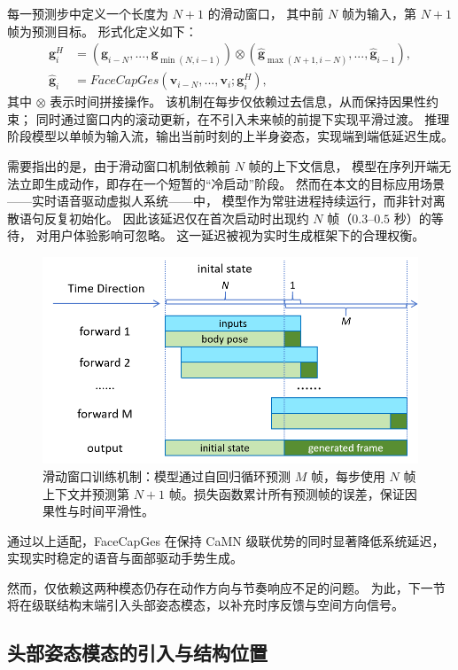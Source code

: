 每一预测步中定义一个长度为 $N+1$ 的滑动窗口，
其中前 $N$ 帧为输入，第 $N+1$ 帧为预测目标。
形式化定义如下：
\begin{align}
\bm{g}^H_i &= (\bm{g}_{i-N}, ..., \bm{g}_{\min(N, i-1)}) \otimes (\hat{\bm{g}}_{\max(N+1, i-N)}, ..., \hat{\bm{g}}_{i-1}), \\
\hat{\bm{g}}_i &= FaceCapGes(\bm{v}_{i-N}, ..., \bm{v}_i; \bm{g}^H_i),
\end{align}
其中 $\otimes$ 表示时间拼接操作。
该机制在每步仅依赖过去信息，从而保持因果性约束；
同时通过窗口内的滚动更新，在不引入未来帧的前提下实现平滑过渡。
推理阶段模型以单帧为输入流，输出当前时刻的上半身姿态，实现端到端低延迟生成。

需要指出的是，由于滑动窗口机制依赖前 $N$ 帧的上下文信息，
模型在序列开端无法立即生成动作，即存在一个短暂的“冷启动”阶段。
然而在本文的目标应用场景——实时语音驱动虚拟人系统——中，
模型作为常驻进程持续运行，而非针对离散语句反复初始化。
因此该延迟仅在首次启动时出现约 $N$ 帧（$0.3$--$0.5$ 秒）的等待，
对用户体验影响可忽略。
这一延迟被视为实时生成框架下的合理权衡。

\begin{figure}[h!t]
\centering
\includegraphics[width=0.75\linewidth]{figures/Fig2.png}
\caption{滑动窗口训练机制：模型通过自回归循环预测 $M$ 帧，每步使用 $N$ 帧上下文并预测第 $N+1$ 帧。损失函数累计所有预测帧的误差，保证因果性与时间平滑性。}
\label{fig2_}
\end{figure}

通过以上适配，FaceCapGes 在保持 CaMN 级联优势的同时显著降低系统延迟，
实现实时稳定的语音与面部驱动手势生成。

然而，仅依赖这两种模态仍存在动作方向与节奏响应不足的问题。
为此，下一节将在级联结构末端引入头部姿态模态，以补充时序反馈与空间方向信号。

\subsection{头部姿态模态的引入与结构位置}
\label{sec:head_encoder}

